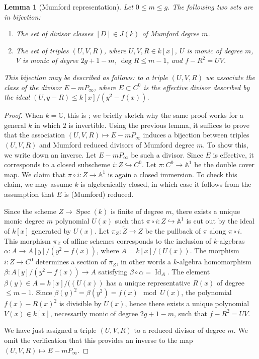 \documentclass{article} %
\newtheorem{lemma}[proposition]{Lemma}
\numberwithin{equation}{section}
\DeclareMathOperator{\Id}{Id}
\DeclareMathOperator{\Spec}{Spec}
\newcommand{\A}{\mathbb{A}}
\begin{document}
\begin{lemma}[Mumford representation]\label{lemma_Mumford_rep}
    Let $0\leq m \leq g$.
    The following two sets are in bijection:
    \begin{enumerate}
        \item The set of divisor classes  $[D] \in J(k)$ of Mumford degree $m$.
        \item The set of triples $(U, V, R)$, where $U, V, R \in k[x]$, $U$ is monic of degree $m$, $V$ is monic of degree $2g + 1 - m$, $\deg R \leq m-1$, and $f - R^2 = UV$.
    \end{enumerate}
    This bijection may be described as follows: to a triple $(U, V, R)$ we associate the class of the divisor $E - m P_\infty$, where $E \subset C^0$ is the effective divisor described by the ideal $(U, y-R) \leq k[x] / (y^2 - f(x))$. 
\end{lemma}
\begin{proof}
    When $k=  \mathbb{C}$, this is \cite[Chapter IIIa, \S1, Proposition 1.2]{MumfordTataII}; we briefly sketch why the same proof works for a general $k$ in which $2$ is invertible.
    Using the previous lemma, it suffices to prove that the association $(U,V,R)\mapsto E - mP_{\infty}$ induces a bijection between triples $(U,V,R)$ and Mumford reduced divisors of Mumford degree $m$.
    To show this, we write down an inverse.
    Let $E - mP_{\infty}$ be such a divisor.
    Since $E$ is effective, it corresponds to a closed subscheme $i\colon Z\hookrightarrow C^{0}$.
    Let $\pi\colon C^{0}\rightarrow \A^1$ be the double cover map.
    We claim that $\pi\circ i \colon Z\rightarrow \A^1$ is again a closed immersion. To check this claim, we may assume $k$ is algebraically closed, in which case it follows from the assumption that $E$ is (Mumford) reduced.
    
    Since the scheme $Z\rightarrow \Spec(k)$ is finite of degree $m$, there exists a unique monic degree $m$ polynomial $U(x)$ such that $\pi\circ i\colon Z\hookrightarrow \A^1$ is cut out by the ideal of $k[x]$ generated by $U(x)$.
    Let $\pi_Z\colon \tilde{Z}\rightarrow Z$ be the pullback of $\pi$ along $\pi \circ i$.
    This morphism $\pi_Z$ of affine schemes corresponds to the inclusion of $k$-algebras $\alpha\colon A \rightarrow A[y]/(y^2 - f(x))$, where $A = k[x]/(U(x))$.
    The morphism $i\colon Z\rightarrow C^{0}$ determines a section of $\pi_Z$, in other words a $k$-algebra homomorphism $\beta\colon A[y]/(y^2- f(x)) \rightarrow A$ satisfying $\beta\circ \alpha = \Id_{A}$.
    The element $\beta(y) \in A = k[x]/((U(x))$ has a unique representative $R(x)$ of degree $\leq m-1$. 
    Since $\beta(y)^2 = \beta(y^2) = f(x) \mod U(x)$, the polynomial $f(x)-R(x)^2$ is divisible by $U(x)$, hence there exists a unique polynomial $V(x) \in k[x]$, necessarily monic of degree $2g+1-m$, such that $f-R^2 = UV$.

    We have just assigned a triple $(U,V,R)$ to a reduced divisor of degree $m$. 
   We omit the verification that this provides an inverse to the map $(U,V,R)\mapsto E - mP_{\infty}$.
\end{proof}
\end{document}
